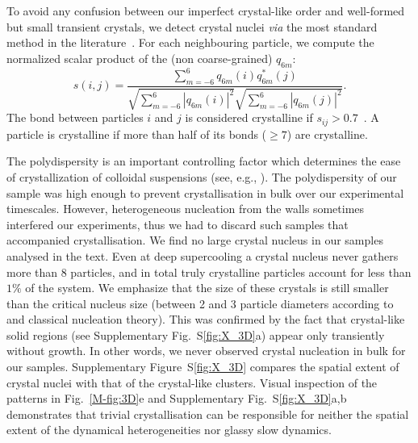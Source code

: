 \documentclass[prl,twocolumn,notitlepage]{revtex4-1}
\begin{document}
To avoid any confusion between our imperfect crystal-like order and well-formed but small transient crystals, we detect crystal nuclei \emph{via} the most standard method in the literature~\cite{ReintenWolde1996, Zaccarelli2009}. For each neighbouring particle, we compute the normalized scalar product of the (non coarse-grained) $q_{6 m}$:
\begin{equation}
	s(i,j) = \frac{
		\sum_{m=-6}^{6} q_{6 m}(i) q_{6 m}^{*}(j)
	}{
		\sqrt{\sum_{m=-6}^{6} |q_{6 m}(i)|^2} \sqrt{\sum_{m=-6}^{6} |q_{6 m}(j)|^2}
	}.
	\label{eq:boo_dot_product}
\end{equation}
The bond between particles $i$ and $j$ is considered crystalline if $s_{ij}>0.7$~\cite{Zaccarelli2009}. A particle is crystalline if more than half of its bonds ($\geq 7$) are crystalline. 

The polydispersity is an important controlling factor which determines the ease of crystallization of colloidal suspensions (see, e.g., \cite{Zaccarelli2009}). 
The polydispersity of our sample was high enough to prevent crystallisation in bulk over our experimental timescales. 
However, heterogeneous nucleation from the walls sometimes interfered our experiments, thus we had to discard such samples that accompanied crystallisation. 
We find no large crystal nucleus in our samples analysed in the text. Even at deep supercooling a crystal nucleus never gathers more than 8 particles, and in total truly crystalline particles account for less than $1\%$ of the system. We emphasize that the size of these crystals is still smaller than the critical nucleus size (between 2 and 3 particle diameters according to~\cite{Auer2001} and classical nucleation theory). This was confirmed by the fact that crystal-like solid regions (see Supplementary Fig.~S\ref{fig:X_3D}a) appear only transiently without growth. In other words, we never observed crystal nucleation in bulk for our samples. Supplementary Figure~S\ref{fig:X_3D} compares the spatial extent of crystal nuclei with that of the crystal-like clusters. Visual inspection of the patterns in Fig.~\ref{M-fig:3D}e and Supplementary Fig.~S\ref{fig:X_3D}a,b  demonstrates that trivial crystallisation can be responsible for neither the spatial extent of the dynamical heterogeneities nor glassy slow dynamics.
\end{document}

